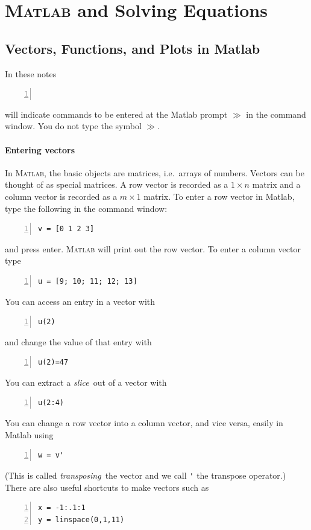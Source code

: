 
\part{\textsc{Matlab} and Solving Equations}


\chapter{Vectors, Functions, and  Plots in {\sc Matlab}}
\label{lec:vectors}

In these notes 
\begin{lstlisting}[frame=none,numbers=left,showlines=true]


\end{lstlisting}
will indicate commands to be entered 
at the {\sc Matlab} prompt \(\gg\) in the command window.
You do not type the symbol \(\gg\).


\subsection*{Entering vectors}

In \textsc{Matlab}, the basic objects are matrices, i.e.~arrays
of numbers. Vectors can be thought of as special matrices.
A row vector is recorded as a $1 \times n$ matrix
and a column vector is recorded as a $m \times 1$ matrix.
To enter a row vector in Matlab, type the following in the command window:
\begin{lstlisting}[frame=none,numbers=left]
v = [0 1 2 3]
\end{lstlisting}
and press enter. \textsc{Matlab} will print out the row vector.
To enter a column vector type
\begin{lstlisting}[frame=none,numbers=left]
u = [9; 10; 11; 12; 13]
\end{lstlisting}
You can access an entry in a vector with
\begin{lstlisting}[frame=none,numbers=left]
u(2)
\end{lstlisting}
and change the value of that entry with
\begin{lstlisting}[frame=none,numbers=left]
u(2)=47
\end{lstlisting}
You can extract a {\em slice}\ out of a vector with
\begin{lstlisting}[frame=none,numbers=left]
u(2:4)
\end{lstlisting}
You can change a row vector into a column vector, and vice versa,
easily in Matlab using
\begin{lstlisting}[frame=none,numbers=left]
w = v'
\end{lstlisting}
(This is called {\em transposing}\ the vector and we call \verb&'&
the transpose operator.)
There are also useful shortcuts to make vectors such as
\begin{lstlisting}[frame=none,numbers=left]
x = -1:.1:1
y = linspace(0,1,11)
\end{lstlisting}

